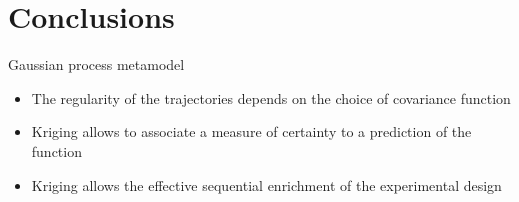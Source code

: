 \documentclass[9pt]{beamer}
\begin{document}

\section{Conclusions}

\begin{frame}{Gaussian process metamodel }

\begin{itemize}
\item The regularity of the trajectories depends on the choice of covariance function
\vspace{0.6cm}
\item Kriging allows to associate a measure of certainty to a prediction of the function
\vspace{0.6cm}
\item Kriging allows the effective sequential enrichment of the experimental design
\end{itemize}

\end{frame}

\footnotesize


\begin{frame}[plain]
		\vskip-3ex
\begin{columns}[t]
	\begin{column}{5.5cm}
  \begin{center}
  \textcolor{orange}{\Huge Thank you}
  \end{center}
  	\end{column}
	\begin{column}{3.2cm}
	  	\end{column}
	  	\end{columns}
\end{frame}
\end{document}
